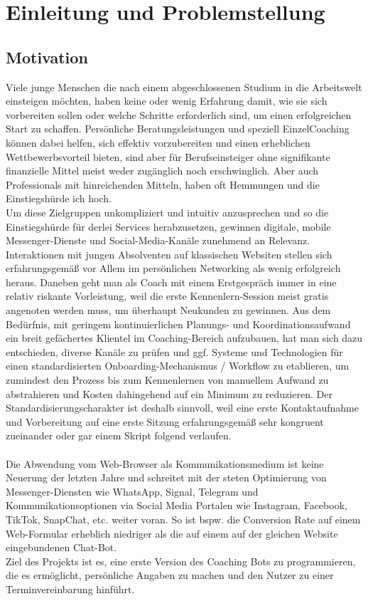 \chapter{Einleitung und Problemstellung}


    \section{Motivation}
        
        Viele junge Menschen die nach einem abgeschlossenen Studium in die Arbeitswelt einsteigen möchten, haben keine oder wenig Erfahrung damit, wie sie sich vorbereiten sollen oder welche Schritte erforderlich sind, um einen erfolgreichen Start zu schaffen. Persönliche Beratungsleistungen und speziell Einzel\-Coaching können dabei helfen, sich effektiv vorzubereiten und einen erheblichen Wettbewerbsvorteil bieten, sind aber für Berufseinsteiger ohne signifikante finanzielle Mittel meist weder zugänglich noch erschwinglich. Aber auch Professionals mit hinreichenden Mitteln, haben oft Hemmungen und die Einstiegshürde ich hoch.\\
        
        Um diese Zielgruppen unkompliziert und intuitiv anzusprechen und so die Einstiegshürde für derlei Services herabzusetzen, gewinnen digitale, mobile Messenger-Dienste und Social-Media-Kanäle zunehmend an Relevanz. Interaktionen mit jungen Absolventen auf klassischen Websiten stellen sich erfahrungsgemäß vor Allem im persönlichen Networking als wenig erfolgreich heraus. Daneben geht man als Coach mit einem Erstgespräch immer in eine relativ riskante Vorleistung, weil die erste Kennenlern-Session meist gratis angenoten werden muss, um überhaupt Neukunden zu gewinnen. 
        Aus dem Bedürfnis, mit geringem kontinuierlichen Planungs- und Koordinationsaufwand ein breit gefächertes Klientel im Coaching-Bereich aufzubauen, hat man sich dazu entschieden, diverse Kanäle zu prüfen und ggf. Systeme und Technologien für einen standardisierten Onboarding-Mechanismus / Workflow zu etablieren, um zumindest den Prozess bis zum Kennenlernen von manuellem Aufwand zu abstrahieren und Kosten dahingehend auf ein Minimum zu reduzieren. Der Standardisierungscharakter ist deshalb sinnvoll, weil eine erste Kontaktaufnahme und Vorbereitung auf eine erste Sitzung erfahrungsgemäß sehr kongruent zueinander oder gar einem Skript folgend verlaufen. \\
        \\
        Die Abwendung vom Web-Browser als Kommunikationsmedium ist keine Neuerung der letzten Jahre und schreitet mit der steten Optimierung von Messenger-Diensten wie WhatsApp, Signal, Telegram und Kommunikationsoptionen via Social Media Portalen wie Instagram, Facebook, TikTok, SnapChat, etc. weiter voran. So ist bspw. die Conversion Rate auf einem Web-Formular erheblich niedriger als die auf einem auf der gleichen Website eingebundenen Chat-Bot. 
        \\
        Ziel des Projekts ist es, eine erste Version des Coaching Bots zu programmieren, die es ermöglicht, persönliche Angaben zu machen und den Nutzer zu einer Terminvereinbarung hinführt.

